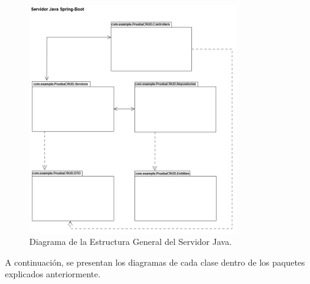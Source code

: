 \begin{figure}[htbp!]
	\begin{center}
		\includegraphics[width=0.8\textwidth]{Clases/DCG.png}
		\caption{Diagrama de la Estructura General del Servidor Java.}
		\label{fig:DCG}
	\end{center}
\end{figure}

A continuación, se presentan los diagramas de cada clase dentro de los paquetes explicados anteriormente.

\newpage

\newpage

\newpage

\newpage

\newpage

\newpage